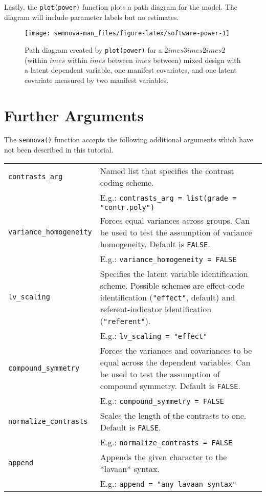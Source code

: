 \documentclass[
]{book}
\begin{document}
Lastly, the \texttt{plot(power)} function plots a path diagram for the model. The diagram will include parameter labels but no estimates.

\begin{figure}

{\centering \texttt{[image: semnova-man\_files/figure-latex/software-power-1]} 

}

\caption{Path diagram created by \texttt{plot(power)} for a $2  imes 3  imes 2  imes 2$ (within $   imes$ within $  imes$ between $ imes$ between) mixed design with a latent dependent variable, one manifest covariates, and one latent covariate measured by two manifest variables.}\label{fig:software-power}
\end{figure}

\hypertarget{further-arguments}{%
\chapter{Further Arguments}\label{further-arguments}}

The \texttt{semnova()} function accepts the following additional arguments which have not been described in this tutorial.

\begin{table}
\centering
\begin{tabular}{>{\raggedright\arraybackslash}p{}>{\raggedright\arraybackslash}p{}}
\toprule
\texttt{contrasts\_arg} & Named list that specifies the contrast coding scheme.\\
 & E.g.: \texttt{contrasts\_arg = list(grade = "contr.poly")}\\
\texttt{variance\_homogeneity} & Forces equal variances across groups. Can be used to test the assumption of variance homogeneity. Default is \texttt{FALSE}.\\
 & E.g.: \texttt{variance\_homogeneity = FALSE}\\
\texttt{lv\_scaling} & Specifies the latent variable identification scheme. Possible schemes are effect-code identification (\texttt{"effect"}, default) and referent-indicator identification (\texttt{"referent"}).\\
\addlinespace
 & E.g.: \texttt{lv\_scaling = "effect"}\\
\texttt{compound\_symmetry} & Forces the variances and covariances to be equal across the dependent variables. Can be used to test the assumption of compound symmetry. Default is \texttt{FALSE}.\\
 & E.g.: \texttt{compound\_symmetry = FALSE}\\
\texttt{normalize\_contrasts} & Scales the length of the contrasts to one. Default is \texttt{FALSE}.\\
 & E.g.: \texttt{normalize\_contrasts = FALSE}\\
\addlinespace
\texttt{append} & Appends the given character to the *lavaan* syntax.\\
 & E.g.: \texttt{append = "any lavaan syntax"}\\
\bottomrule
\end{tabular}
\end{table}
\end{document}
